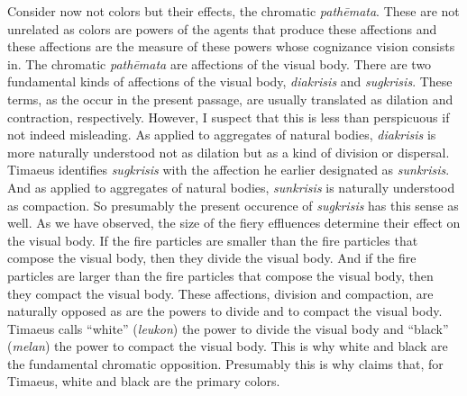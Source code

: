 
Consider now not colors but their effects, the chromatic \emph{pathēmata}. These are not unrelated as colors are powers of the agents that produce these affections and these affections are the measure of these powers whose cognizance vision consists in. The chromatic \emph{pathēmata} are affections of the visual body. There are two fundamental kinds of affections of the visual body, \emph{diakrisis} and \emph{sugkrisis}. These terms, as the occur in the present passage, are usually translated as dilation and contraction, respectively. However, I suspect that this is less than perspicuous if not indeed misleading. As applied to aggregates of natural bodies, \emph{diakrisis} is more naturally understood not as dilation but as a kind of division or dispersal. Timaeus identifies \emph{sugkrisis} with the affection he earlier designated as \emph{sunkrisis}. And as applied to aggregates of natural bodies, \emph{sunkrisis} is naturally understood as compaction. So presumably the present occurence of \emph{sugkrisis} has this sense as well. As we have observed, the size of the fiery effluences determine their effect on the visual body. If the fire particles are smaller than the fire particles that compose the visual body, then they divide the visual body. And if the fire particles are larger than the fire particles that compose the visual body, then they compact the visual body. These affections, division and compaction, are naturally opposed as are the powers to divide and to compact the visual body. Timaeus calls ``white'' (\emph{leukon}) the power to divide the visual body and ``black'' (\emph{melan}) the power to compact the visual body. This is why white and black are the fundamental chromatic opposition. Presumably this is why \citet[480--1]{Taylor:1928qb} claims that, for Timaeus, white and black are the primary colors. 

